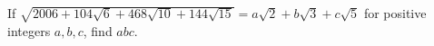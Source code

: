 If $\sqrt{2006+104\sqrt6+468\sqrt{10}+144\sqrt{15}}=a\sqrt2+b\sqrt3+c\sqrt5$ for positive integers $a,b,c$, find $abc$.
